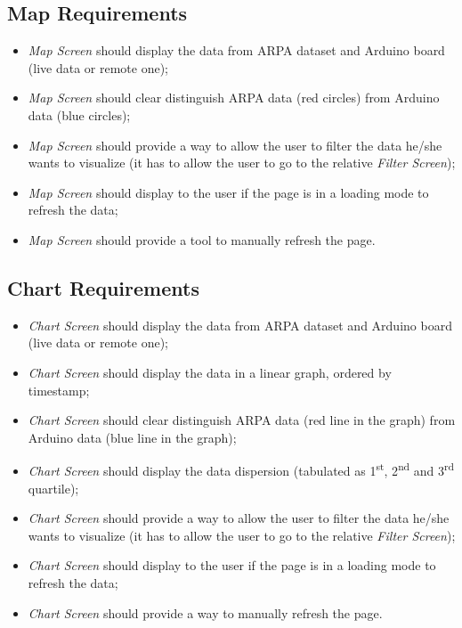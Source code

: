 \subsection{Map Requirements}
\begin{itemize}
    \item \textit{Map Screen} should display the data from ARPA dataset and Arduino board (live data or remote one);
    \item \textit{Map Screen} should clear distinguish ARPA data (red circles) from Arduino data (blue circles);
    \item \textit{Map Screen} should provide a way to allow the user to filter the data he/she wants to visualize (it has to allow the user to go to the relative \textit{Filter Screen});
    \item \textit{Map Screen} should display to the user if the page is in a loading mode to refresh the data;
    \item \textit{Map Screen} should provide a tool to manually refresh the page.
\end{itemize}
    
\subsection{Chart Requirements}
\begin{itemize}
    \item \textit{Chart Screen} should display the data from ARPA dataset and Arduino board (live data or remote one);
    \item \textit{Chart Screen} should display the data in a linear graph, ordered by timestamp;
    \item \textit{Chart Screen} should clear distinguish ARPA data (red line in the graph) from Arduino data (blue line in the graph);
    \item \textit{Chart Screen} should display the data dispersion (tabulated as 1\textsuperscript{st}, 2\textsuperscript{nd} and 3\textsuperscript{rd} quartile);
    \item \textit{Chart Screen} should provide a way to allow the user to filter the data he/she wants to visualize (it has to allow the user to go to the relative \textit{Filter Screen});
    \item \textit{Chart Screen} should display to the user if the page is in a loading mode to refresh the data;
    \item \textit{Chart Screen} should provide a way to manually refresh the page.
\end{itemize}
    
